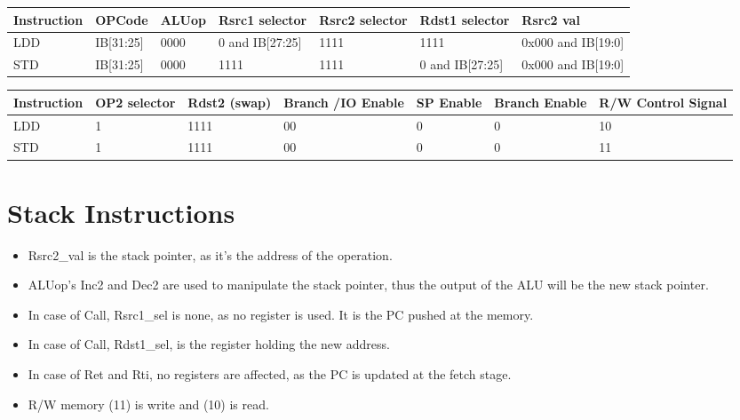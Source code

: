 \begin{center}
\begin{tabular}{||p{20mm}| p{15mm}| p{15mm}| p{15mm}| p{15mm}| p{15mm}| p{15mm}||} 
\hline
Instruction & OPCode & ALUop & Rsrc1 selector & Rsrc2 selector & Rdst1 selector & Rsrc2 val \\ [0.5ex] 
\hline\hline
LDD & IB[31:25] & 0000 & 0 and IB[27:25] & 1111 & 1111 & 0x000 and IB[19:0] \\
\hline
STD & IB[31:25] & 0000 & 1111 & 1111 & 0 and IB[27:25] & 0x000 and IB[19:0] \\
\hline
\end{tabular}
\end{center}

\begin{center}
\begin{tabular}{||p{20mm}| p{15mm}| p{15mm}| p{15mm}| p{15mm}| p{15mm}| p{15mm}||} 
\hline
Instruction & OP2 selector & Rdst2 (swap) & Branch /IO Enable & SP Enable & Branch Enable & R/W Control Signal  \\ [0.5ex] 
\hline\hline
LDD & 1 & 1111 & 00 & 0 & 0 & 10 \\
\hline
STD & 1 & 1111 & 00 & 0 & 0 & 11 \\
\hline
\end{tabular}
\end{center}

\section{Stack Instructions}
\begin{itemize}
    \item Rsrc2\_val is the stack pointer, as it's the address of the operation.
    \item ALUop's Inc2 and Dec2 are used to manipulate the stack pointer, thus the output of the ALU will be the new stack pointer.
    \item In case of Call, Rsrc1\_sel is none, as no register is used. It is the PC pushed at the memory.
    \item In case of Call, Rdst1\_sel, is the register holding the new address.
    \item In case of Ret and Rti, no registers are affected, as the PC is updated at the fetch stage.
    \item R/W memory (11) is write and (10) is read.
\end{itemize}

